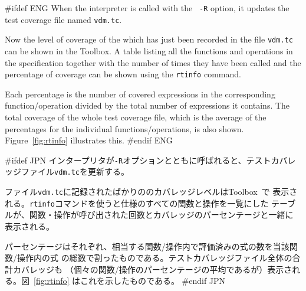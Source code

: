 \documentclass[\pformat,12pt]{article}
\newcommand{\Toolbox}{Toolbox}
\newcommand{\Toolbox}{Toolbox}
\newcommand{\cmd}{\tt }
\begin{document}
#ifdef ENG
When the interpreter is called with the {\tt 
-R} option, it updates the test coverage file named {\tt vdm.tc}.

Now the level of coverage of the  which has just been recorded in
  the file {\tt vdm.tc} can be shown in the \Toolbox.  A
table listing all the functions and operations in the specification
together with the number of times they have been called and the
percentage of coverage can be shown using the {\cmd rtinfo} command.

Each percentage is the number of covered expressions in the
  corresponding function/operation 
divided by the total number of expressions it contains.  The total
coverage of the whole test coverage file, which is the average of the
percentages for the individual functions/operations, is also
shown. Figure~\ref{fig:rtinfo} illustrates this.
#endif ENG

#ifdef JPN
インタープリタが{\tt -R}オプションとともに呼ばれると、テストカバレッジファイル{\tt vdm.tc}を更新する。

ファイル{\tt vdm.tc}に記録されたばかりののカバレッジレベルは\Toolbox\ で
表示される。{\cmd rtinfo}コマンドを使うと仕様のすべての関数と操作を一覧にした
テーブルが、関数・操作が呼び出された回数とカバレッジのパーセンテージと一緒に
表示される。

パーセンテージはそれぞれ、相当する関数/操作内で評価済みの式の数を当該関数/操作内の式
の総数で割ったものである。テストカバレッジファイル全体の合計カバレッジも
（個々の関数/操作のパーセンテージの平均であるが）表示される。図~\ref{fig:rtinfo} 
はこれを示したものである。
#endif JPN
\end{document}
